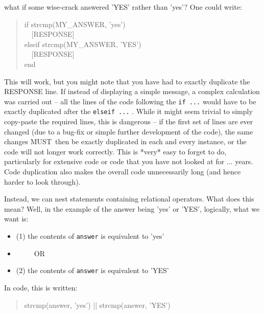 \documentclass{tufte-book} %
\newenvironment{docspec}{\begin{quotation}\ttfamily\parskip0pt\parindent0pt\ignorespaces}{\end{quotation}}
\begin{document}
 what if some wise-crack answered 'YES' rather than 'yes'? One could write:
\begin{docspec}
if strcmp(MY\_ANSWER, 'yes')
\\ \ \ [RESPONSE]
\\elseif strcmp(MY\_ANSWER, 'YES')
\\ \ \ [RESPONSE]
\\end
\end{docspec}
This will work, but you might note that you have had to exactly duplicate the RESPONSE line. If instead of displaying a simple message, a complex calculation was carried out -- all the lines of the code following the \texttt{if ...} would have to be exactly duplicated after the \texttt{elseif ...} . While it might seem trivial to simply copy-paste the required lines, this is dangerous -- if the first set of lines are ever changed (due to a bug-fix or simple further development of the code), the same changes MUST\ then be exactly duplicated in each and every instance, or the code will not longer work correctly. This is *very* easy to forget to do, particularly for extensive code or code that you have not looked at for ... years. Code duplication also makes the overall code unnecessarily long (and hence harder to look through).

Instead, we can nest statements containing relational operators. What does this mean? Well, in the example of the answer being 'yes' or 'YES', logically, what we want is:

\begin{itemize}[noitemsep]
\setlength{\itemindent}{.2in}
\item[] (1) the contents of \texttt{answer} is equivalent to 'yes'
\item[] \ \ \ \ \ OR
\item[] (2) the contents of \texttt{answer} is equivalent to 'YES'
\end{itemize}
In code, this is written:
\begin{docspec}
strcmp(answer, 'yes') || strcmp(answer, 'YES')
\end{docspec}
\end{document}
